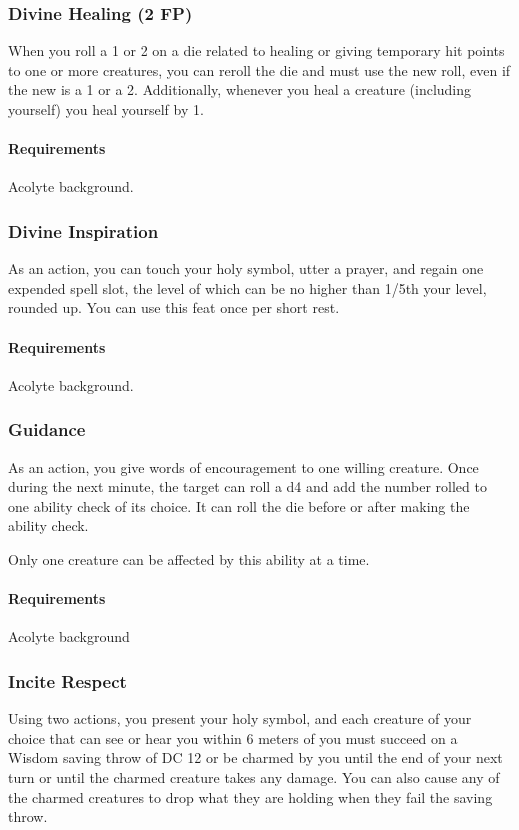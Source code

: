        \subsubsection{Divine Healing (2 FP)} \label{feat::divinehealing}
            When you roll a 1 or 2 on a die related to healing or giving temporary hit points to one or more creatures, you can reroll the die and must use the new roll, even if the new is a 1 or a 2.
            Additionally, whenever you heal a creature (including yourself) you heal yourself by 1.
            \paragraph{Requirements} Acolyte background.
        \subsubsection{Divine Inspiration} \label{feat::divineinspiration}
            As an action, you can touch your holy symbol, utter a prayer, and regain one expended spell slot, the level of which can be no higher than 1/5th your level, rounded up.
            You can use this feat once per short rest.
            \paragraph{Requirements} Acolyte background.
        \subsubsection{Guidance} \label{feat::guidance}
            As an action, you give words of encouragement to one willing creature.
            Once during the next minute, the target can roll a d4 and add the number rolled to one ability check of its choice.
            It can roll the die before or after making the ability check.

            Only one creature can be affected by this ability at a time.
            \paragraph{Requirements} Acolyte background
        \subsubsection{Incite Respect} \label{feat::inciterespect}
            Using two actions, you present your holy symbol, and each creature of your choice that can see or hear you within 6 meters of you must succeed on a Wisdom saving throw of DC 12 or be charmed by you until the end of your next turn or until the charmed creature takes any damage.
            You can also cause any of the charmed creatures to drop what they are holding when they fail the saving throw.

